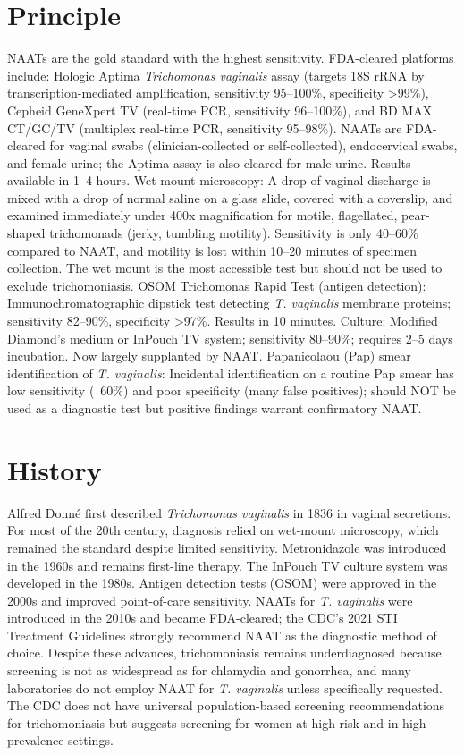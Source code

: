 \section*{Principle}
NAATs are the gold standard with the highest sensitivity. FDA-cleared platforms include: Hologic Aptima \textit{Trichomonas vaginalis} assay (targets 18S rRNA by transcription-mediated amplification, sensitivity 95--100\%, specificity >99\%), Cepheid GeneXpert TV (real-time PCR, sensitivity 96--100\%), and BD MAX CT/GC/TV (multiplex real-time PCR, sensitivity 95--98\%). NAATs are FDA-cleared for vaginal swabs (clinician-collected or self-collected), endocervical swabs, and female urine; the Aptima assay is also cleared for male urine. Results available in 1--4 hours. Wet-mount microscopy: A drop of vaginal discharge is mixed with a drop of normal saline on a glass slide, covered with a coverslip, and examined immediately under 400x magnification for motile, flagellated, pear-shaped trichomonads (jerky, tumbling motility). Sensitivity is only 40--60\% compared to NAAT, and motility is lost within 10--20 minutes of specimen collection. The wet mount is the most accessible test but should not be used to exclude trichomoniasis. OSOM Trichomonas Rapid Test (antigen detection): Immunochromatographic dipstick test detecting \textit{T. vaginalis} membrane proteins; sensitivity 82--90\%, specificity >97\%. Results in 10 minutes. Culture: Modified Diamond's medium or InPouch TV system; sensitivity 80--90\%; requires 2--5 days incubation. Now largely supplanted by NAAT. Papanicolaou (Pap) smear identification of \textit{T. vaginalis}: Incidental identification on a routine Pap smear has low sensitivity (~60\%) and poor specificity (many false positives); should NOT be used as a diagnostic test but positive findings warrant confirmatory NAAT.

\section*{History}
Alfred Donn\'e first described \textit{Trichomonas vaginalis} in 1836 in vaginal secretions. For most of the 20th century, diagnosis relied on wet-mount microscopy, which remained the standard despite limited sensitivity. Metronidazole was introduced in the 1960s and remains first-line therapy. The InPouch TV culture system was developed in the 1980s. Antigen detection tests (OSOM) were approved in the 2000s and improved point-of-care sensitivity. NAATs for \textit{T. vaginalis} were introduced in the 2010s and became FDA-cleared; the CDC's 2021 STI Treatment Guidelines strongly recommend NAAT as the diagnostic method of choice. Despite these advances, trichomoniasis remains underdiagnosed because screening is not as widespread as for chlamydia and gonorrhea, and many laboratories do not employ NAAT for \textit{T. vaginalis} unless specifically requested. The CDC does not have universal population-based screening recommendations for trichomoniasis but suggests screening for women at high risk and in high-prevalence settings.

